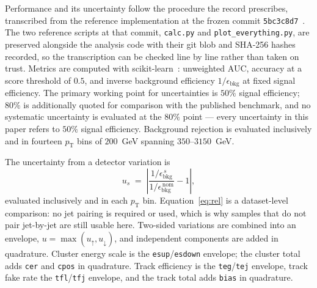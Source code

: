 \documentclass[pdflatex,sn-mathphys,Numbered,iicol]{sn-jnl}
\newcommand{\pt}{p_{\mathrm{T}}}
\begin{document}
Performance and its uncertainty follow the procedure the record prescribes, transcribed
from the reference implementation at the frozen commit
\texttt{5bc3c8d7}~\cite{ATLASGitLab}. The two reference scripts at that commit,
\texttt{calc.py} and \texttt{plot\_everything.py}, are preserved alongside the analysis
code with their git blob and SHA-256 hashes recorded, so the transcription can be
checked line by line rather than taken on trust. Metrics are computed with
scikit-learn~\cite{Pedregosa2011}: unweighted AUC, accuracy at a score threshold of
$0.5$, and inverse background efficiency $1/\epsilon_{\mathrm{bkg}}$ at fixed signal
efficiency. The primary working point for uncertainties is $50\%$ signal efficiency;
$80\%$ is additionally quoted for comparison with the published benchmark, and no
systematic uncertainty is evaluated at the $80\%$ point --- every uncertainty in this
paper refers to $50\%$ signal efficiency. Background rejection is evaluated inclusively
and in fourteen $\pt$ bins of $200$~GeV spanning $350$--$3150$~GeV.

The uncertainty from a detector variation is
\begin{equation}
u_s \;=\; \left| \frac{1/\epsilon_{\mathrm{bkg}}^{\,s}}
                       {1/\epsilon_{\mathrm{bkg}}^{\,\mathrm{nom}}} - 1 \right| ,
\label{eq:rel}
\end{equation}
evaluated inclusively and in each $\pt$ bin. Equation~\ref{eq:rel} is a
dataset-level comparison: no jet
pairing is required or used, which is why samples that do not pair jet-by-jet are still
usable here. Two-sided variations are combined into an envelope,
$u = \max(u_{\uparrow}, u_{\downarrow})$, and independent components are added in
quadrature. Cluster energy scale is the \texttt{esup}/\texttt{esdown} envelope; the
cluster total adds \texttt{cer} and \texttt{cpos} in quadrature. Track efficiency is the
\texttt{teg}/\texttt{tej} envelope, track fake rate the \texttt{tfl}/\texttt{tfj}
envelope, and the track total adds \texttt{bias} in quadrature.
\end{document}
